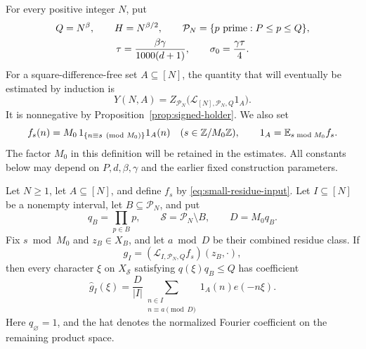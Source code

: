 For every positive integer \(N\), put
\begin{equation}
 \begin{gathered}
 Q=N^\beta,\qquad H=N^{\beta/2},\qquad
 \mathcal P_N=\{p\ {\rm prime}:P\le p\le Q\},\\
 \tau=\frac{\beta\gamma}{1000(d+1)},\qquad
 \sigma_0=\frac{\gamma\tau}{4}.
 \end{gathered}
 \label{eq:scale-parameters}
\end{equation}
For a square-difference-free set \(A\subseteq[N]\), the quantity that will
eventually be estimated by induction is
\begin{equation}
 Y(N,A)=
 Z_{\mathcal P_N}\bigl(\mathcal L_{[N],\mathcal P_N,Q}1_A\bigr).
 \label{eq:induction-functional}
\end{equation}
It is nonnegative by Proposition~\ref{prop:signed-holder}.  We also set
\begin{equation}
 f_s(n)=M_0\,1_{\{n\equiv s\pmod{M_0}\}}1_A(n)
 \quad(s\in\mathbb Z/M_0\mathbb Z),
 \qquad
 1_A=\mathbb E_{s\bmod M_0}f_s.
 \label{eq:small-residue-input}
\end{equation}
The factor \(M_0\) in this definition will be retained in the estimates.
All constants below may depend on \(P,d,\beta,\gamma\) and the earlier
fixed construction parameters.

\begin{lemma}
\label{lem:exact-fiber}
Let \(N\ge1\), let \(A\subseteq[N]\), and define \(f_s\) by
\eqref{eq:small-residue-input}.  Let \(I\subseteq[N]\) be a nonempty
interval, let \(B\subseteq\mathcal P_N\), and put
\[
 q_B=\prod_{p\in B}p,\qquad
 \mathcal S=\mathcal P_N\setminus B,\qquad D=M_0q_B.
\]
Fix \(s\bmod M_0\) and \(z_B\in X_B\), and let \(a\bmod D\) be their
combined residue class.  If
\[
 g_I=(\mathcal L_{I,\mathcal P_N,Q}f_s)(z_B,\cdot),
\]
then every character \(\xi\) on \(X_{\mathcal S}\) satisfying
\(q(\xi)q_B\le Q\) has coefficient
\begin{equation}
 \widehat g_I(\xi)
 =\frac D{|I|}
   \sum_{\substack{n\in I\\n\equiv a\pmod D}}
       1_A(n)e(-n\xi).
 \label{eq:interval-fiber-coefficient}
\end{equation}
Here \(q_\varnothing=1\), and the hat denotes the normalized Fourier
coefficient on the remaining product space.
\end{lemma}

